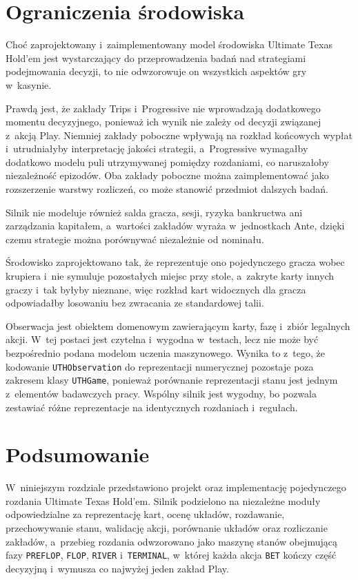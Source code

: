 \section{Ograniczenia środowiska}
\label{sec:ograniczenia-srodowiska}

Choć zaprojektowany i~zaimplementowany model środowiska
Ultimate Texas Hold’em jest wystarczający do przeprowadzenia badań nad strategiami podejmowania decyzji, to nie odwzorowuje on wszystkich aspektów gry w~kasynie.

Prawdą jest, że zakłady Trips i~Progressive nie wprowadzają dodatkowego momentu decyzyjnego,
ponieważ ich wynik nie zależy od decyzji związanej z~akcją Play. Niemniej zakłady poboczne wpływają na
rozkład końcowych wypłat i~utrudniałyby interpretację jakości strategii,
a~Progressive wymagałby dodatkowo modelu puli utrzymywanej pomiędzy
rozdaniami, co naruszałoby niezależność epizodów. Oba zakłady poboczne można zaimplementować jako rozszerzenie warstwy rozliczeń, co może stanowić przedmiot dalszych badań.

Silnik nie modeluje również
salda gracza, sesji, ryzyka bankructwa ani zarządzania kapitałem, a~wartości
zakładów wyraża w~jednostkach Ante, dzięki czemu strategie można porównywać
niezależnie od nominału.

Środowisko zaprojektowano tak, że reprezentuje ono pojedynczego gracza wobec
krupiera i~nie symuluje pozostałych miejsc przy stole, a~zakryte karty innych
graczy i~tak byłyby nieznane, więc rozkład kart widocznych dla gracza
odpowiadałby losowaniu bez zwracania ze standardowej talii.

Obserwacja jest obiektem domenowym zawierającym karty, fazę i~zbiór
legalnych akcji. W~tej postaci jest czytelna i~wygodna w~testach, lecz nie może
być bezpośrednio podana modelom uczenia maszynowego. Wynika to z~tego, że kodowanie
\texttt{UTHObservation} do reprezentacji numerycznej pozostaje poza zakresem
klasy \texttt{UTHGame}, ponieważ porównanie reprezentacji stanu jest jednym
z~elementów badawczych pracy. Wspólny silnik jest wygodny, bo pozwala zestawiać różne
reprezentacje na identycznych rozdaniach i~regułach.

\section{Podsumowanie}
\label{sec:podsumowanie-srodowiska-uth}

W~niniejszym rozdziale przedstawiono projekt oraz implementację pojedynczego
rozdania Ultimate Texas Hold’em. Silnik podzielono na niezależne moduły
odpowiedzialne za reprezentację kart, ocenę układów, rozdawanie,
przechowywanie stanu, walidację akcji, porównanie układów oraz rozliczanie zakładów,
a~przebieg rozdania odwzorowano jako maszynę stanów obejmującą fazy
\texttt{PREFLOP}, \texttt{FLOP}, \texttt{RIVER} i~\texttt{TERMINAL}, w~której
każda akcja \texttt{BET} kończy część decyzyjną i~wymusza co najwyżej jeden
zakład Play.


